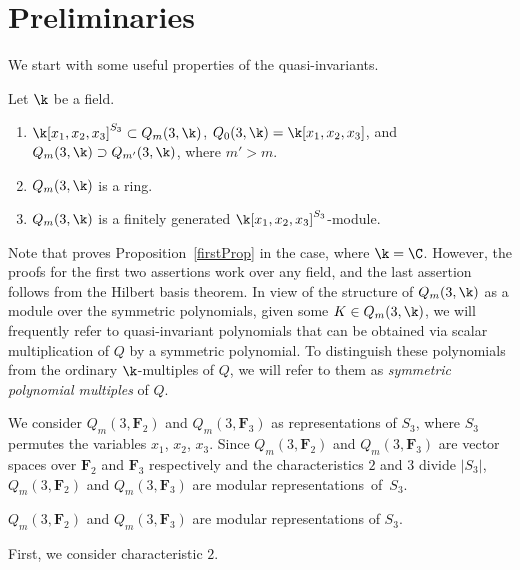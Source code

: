 \section{Preliminaries}\label{prelim}
We start with some useful properties of the quasi-invariants.
\begin{Proposition}\label{firstProp}
 Let $\k$ be a field.
\begin{enumerate}\itemsep=0pt
 \item[$1$.] $\k[x_1,x_2,x_3]^{S_3}\subset Q_m(3,\k)$, $Q_0(3,\k) = \k[x_1,x_2,x_3]$, and $Q_m(3,\k)\supset Q_{m'}(3,\k)$, where ${m'>m}$.
 \item[$2$.] $Q_m(3,\k)$ is a ring.
 \item[$3$.] $Q_m(3,\k)$ is a finitely generated $\k[x_1,x_2,x_3]^{S_3}$-module.
\end{enumerate}
\end{Proposition}

Note that \cite{etingof2002lectures} proves Proposition~\ref{firstProp} in the case, where $\k=\C$. However, the proofs for the first two assertions work over any field, and the last assertion follows from the Hilbert basis theorem. In view of the structure of $Q_m(3,\k)$ as a module over the symmetric polynomials, given some $K\in Q_m(3,\k)$, we will frequently refer to quasi-invariant polynomials that can be obtained via scalar multiplication of $Q$ by a symmetric polynomial. To distinguish these polynomials from the ordinary $\k$-multiples of $Q$, we will refer to them as \emph{symmetric polynomial multiples} of $Q$.

We consider $Q_m(3, \mathbf{F}_{2})$ and $Q_m(3, \mathbf{F}_{3})$ as representations of $S_3$, where $S_3$ permutes the variables $x_1$, $x_2$, $x_3$. Since $Q_m(3, \mathbf{F}_{2})$ and $Q_m(3, \mathbf{F}_{3})$ are vector spaces over $\mathbf{F}_2$ and $\mathbf{F}_3$ respectively and the characteristics $2$ and $3$ divide $|S_3|$, $Q_m(3, \mathbf{F}_{2})$ and $Q_m(3, \mathbf{F}_{3})$ are modular representations~of~$S_3$.

\begin{Proposition}
 $Q_m(3, \mathbf{F}_{2})$ and $Q_m(3, \mathbf{F}_{3})$ are modular representations of $S_3$.
\end{Proposition}

First, we consider characteristic $2$.

